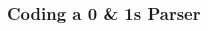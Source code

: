 
\begin{frame}[fragile]
\frametitle{Coding a 0 \& 1s Parser}
\begin{columns}[T]

\begin{column}{0.55\textwidth}

\end{column}

\pause
\begin{column}{0.35\textwidth}

\end{column}

\end{columns}
\end{frame}


